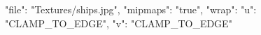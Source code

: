 {
  "file": "Textures/ships.jpg",
  "mipmaps": "true",
  "wrap": {
    "u": "CLAMP_TO_EDGE",
    "v": "CLAMP_TO_EDGE"
  }
}